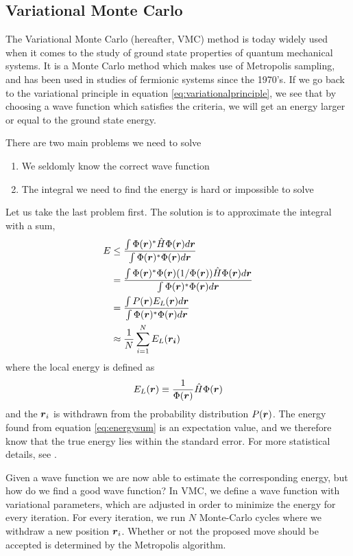 \subsection{Variational Monte Carlo} \label{subsec:vmc}
The Variational Monte Carlo (hereafter, VMC) method is today widely used when it comes to the study of ground state properties of quantum mechanical systems. It is a Monte Carlo method which makes use of Metropolis sampling, and has been used in studies of fermionic systems since the 1970's. \cite{deb2014} If we go back to the variational principle in equation \eqref{eq:variationalprinciple}, we see that by choosing a wave function which satisfies the criteria, we will get an energy larger or equal to the ground state energy. \bigskip

There are two main problems we need to solve
\begin{enumerate}
	\item We seldomly know the correct wave function
	\item The integral we need to find the energy is hard or impossible to solve
\end{enumerate}
Let us take the last problem first. The solution is to approximate the integral with a sum,
\begin{align}
E &\leq \frac{\int\Phi(\boldsymbol{{r}})^*\hat{H}\Phi(\boldsymbol{{r}}) d\boldsymbol{{r}}}{\int\Phi(\boldsymbol{{r}})^*\Phi(\boldsymbol{{r}}) d\boldsymbol{{r}}} \notag\\
& = \frac{\int\Phi(\boldsymbol{{r}})^*\Phi(\boldsymbol{{r}})(1/\Phi(\boldsymbol{{r}}))\hat{H}\Phi(\boldsymbol{{r}}) d\boldsymbol{{r}}}{\int\Phi(\boldsymbol{{r}})^*\Phi(\boldsymbol{{r}}) d\boldsymbol{{r}}} \notag\\
& = \frac{\int P(\boldsymbol{{r}}) E_L(\boldsymbol{{r}}) d\boldsymbol{{r}}}{\int\Phi(\boldsymbol{{r}})^*\Phi(\boldsymbol{{r}}) d\boldsymbol{{r}}} \notag\\
& \approx \frac{1}{N}\sum_{i=1}^NE_L(\boldsymbol{{r_i}}) \label{eq:energysum}
\end{align}
where the local energy is defined as
\begin{equation}
E_L(\boldsymbol{{r}})\equiv\frac{1}{\Phi(\boldsymbol{{r}})}\hat{H}\Phi(\boldsymbol{{r}})
\label{eq:local energy}
\end{equation}
and the $\boldsymbol{{r}}_i$ is withdrawn from the probability distribution $P(\boldsymbol{{r}})$. The energy found from equation \eqref{eq:energysum} is an expectation value, and we therefore know that the true energy lies within the standard error. For more statistical details, see \cite{Deb2014}. 

Given a wave function we are now able to estimate the corresponding energy, but how do we find a good wave function? In VMC, we define a wave function with variational parameters, which are adjusted in order to minimize the energy for every iteration. For every iteration, we run $N$ Monte-Carlo cycles where we withdraw a new position $\boldsymbol{{r}}_i$. Whether or not the proposed move should be accepted is determined by the Metropolis algorithm.

